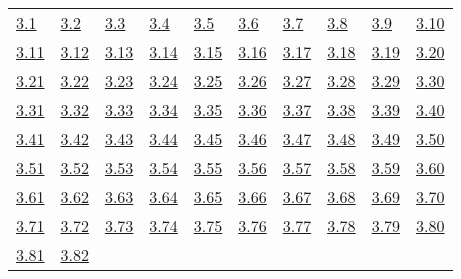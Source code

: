 \begin{tabular}{llllllllll}
\hyperref[練習問題 3.1]{3.1} &
\hyperref[練習問題 3.2]{3.2} &
\hyperref[練習問題 3.3]{3.3} &
\hyperref[練習問題 3.4]{3.4} &
\hyperref[練習問題 3.5]{3.5} &
\hyperref[練習問題 3.6]{3.6} &
\hyperref[練習問題 3.7]{3.7} &
\hyperref[練習問題 3.8]{3.8} &
\hyperref[練習問題 3.9]{3.9} &
\hyperref[練習問題 3.10]{3.10}
\\ 
\hyperref[練習問題 3.11]{3.11} &
\hyperref[練習問題 3.12]{3.12} &
\hyperref[練習問題 3.13]{3.13} &
\hyperref[練習問題 3.14]{3.14} &
\hyperref[練習問題 3.15]{3.15} &
\hyperref[練習問題 3.16]{3.16} &
\hyperref[練習問題 3.17]{3.17} &
\hyperref[練習問題 3.18]{3.18} &
\hyperref[練習問題 3.19]{3.19} &
\hyperref[練習問題 3.20]{3.20}
\\ 
\hyperref[練習問題 3.21]{3.21} &
\hyperref[練習問題 3.22]{3.22} &
\hyperref[練習問題 3.23]{3.23} &
\hyperref[練習問題 3.24]{3.24} &
\hyperref[練習問題 3.25]{3.25} &
\hyperref[練習問題 3.26]{3.26} &
\hyperref[練習問題 3.27]{3.27} &
\hyperref[練習問題 3.28]{3.28} &
\hyperref[練習問題 3.29]{3.29} &
\hyperref[練習問題 3.30]{3.30}
\\ 
\hyperref[練習問題 3.31]{3.31} &
\hyperref[練習問題 3.32]{3.32} &
\hyperref[練習問題 3.33]{3.33} &
\hyperref[練習問題 3.34]{3.34} &
\hyperref[練習問題 3.35]{3.35} &
\hyperref[練習問題 3.36]{3.36} &
\hyperref[練習問題 3.37]{3.37} &
\hyperref[練習問題 3.38]{3.38} &
\hyperref[練習問題 3.39]{3.39} &
\hyperref[練習問題 3.40]{3.40}
\\ 
\hyperref[練習問題 3.41]{3.41} &
\hyperref[練習問題 3.42]{3.42} &
\hyperref[練習問題 3.43]{3.43} &
\hyperref[練習問題 3.44]{3.44} &
\hyperref[練習問題 3.45]{3.45} &
\hyperref[練習問題 3.46]{3.46} &
\hyperref[練習問題 3.47]{3.47} &
\hyperref[練習問題 3.48]{3.48} &
\hyperref[練習問題 3.49]{3.49} &
\hyperref[練習問題 3.50]{3.50}
\\ 
\hyperref[練習問題 3.51]{3.51} &
\hyperref[練習問題 3.52]{3.52} &
\hyperref[練習問題 3.53]{3.53} &
\hyperref[練習問題 3.54]{3.54} &
\hyperref[練習問題 3.55]{3.55} &
\hyperref[練習問題 3.56]{3.56} &
\hyperref[練習問題 3.57]{3.57} &
\hyperref[練習問題 3.58]{3.58} &
\hyperref[練習問題 3.59]{3.59} &
\hyperref[練習問題 3.60]{3.60}
\\ 
\hyperref[練習問題 3.61]{3.61} &
\hyperref[練習問題 3.62]{3.62} &
\hyperref[練習問題 3.63]{3.63} &
\hyperref[練習問題 3.64]{3.64} &
\hyperref[練習問題 3.65]{3.65} &
\hyperref[練習問題 3.66]{3.66} &
\hyperref[練習問題 3.67]{3.67} &
\hyperref[練習問題 3.68]{3.68} &
\hyperref[練習問題 3.69]{3.69} &
\hyperref[練習問題 3.70]{3.70}
\\ 
\hyperref[練習問題 3.71]{3.71} &
\hyperref[練習問題 3.72]{3.72} &
\hyperref[練習問題 3.73]{3.73} &
\hyperref[練習問題 3.74]{3.74} &
\hyperref[練習問題 3.75]{3.75} &
\hyperref[練習問題 3.76]{3.76} &
\hyperref[練習問題 3.77]{3.77} &
\hyperref[練習問題 3.78]{3.78} &
\hyperref[練習問題 3.79]{3.79} &
\hyperref[練習問題 3.80]{3.80}
\\ 
\hyperref[練習問題 3.81]{3.81} &
\hyperref[練習問題 3.82]{3.82} &
\end{tabular} 

